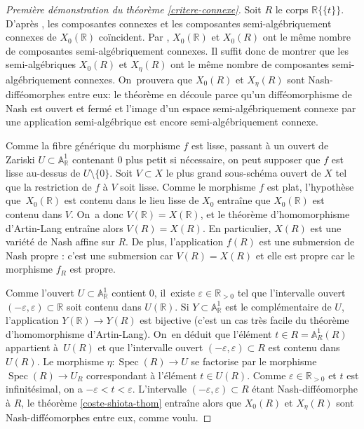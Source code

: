 \documentclass[11pt]{article}
\let\epsilon\varepsilon
\theoremstyle{definition}
\newcommand{\R}{\mathbb R}
\newcommand{\A}{\mathbb A}
\newcommand{\puiseux}{\mathbb{R}\{\!\{t\}\!\}}
\begin{document}
\begin{proof}[Première démonstration du théorème \ref{critere-connexe}]
Soit $R$ le corps $\puiseux$. D'après \cite[Th.\,2.4.5]{bochnak1987geometrie}, les composantes connexes et les composantes semi-algébriquement connexes de $X_0(\R)$ coïncident. Par \cite[Prop.\,5.3.6]{bochnak1998real}, $X_0(\R)$ et $X_0(R)$ ont le même nombre de composantes semi-algébriquement connexes. Il suffit donc de montrer que les semi-algébriques $X_0(R)$ et $X_\eta(R)$ ont le même nombre de composantes semi-algébriquement connexes. On~prouvera que $X_0(R)$ et $X_\eta(R)$ sont Nash-difféomorphes entre eux: le théorème en découle parce qu'un difféomorphisme de Nash est ouvert et fermé et l'image d'un espace semi-algébriquement connexe par une application semi-algébrique est encore semi-algébriquement connexe.

Comme la fibre générique du morphisme $f$ est lisse, passant à un ouvert de Zariski $U\subset \A^1_{\R}$ contenant $0$ plus petit si nécessaire, on peut supposer que $f$ est lisse au-dessus de $U\setminus\{0\}$. Soit $V\subset X$ le plus grand sous-schéma ouvert de $X$ tel que la restriction de $f$ à $V$ soit lisse. Comme le morphisme $f$ est plat, l'hypothèse que~$X_0(\R)$ est contenu dans le lieu lisse de $X_0$ entraîne que $X_0(\R)$ est contenu dans $V$. On~a donc $V(\R)=X(\R)$, et le théorème d'homomorphisme d'Artin-Lang \cite[Th.\,4.1.2]{bochnak1998real} entraîne alors $V(R)=X(R)$. En particulier, $X(R)$ est une variété de Nash affine sur $R$.
De plus, l'application $f(R)$ est une submersion de Nash propre : c'est une submersion car $V(R)=X(R)$ et elle est propre car le morphisme $f_R$ est propre.

Comme l'ouvert $U\subset \A^1_{\R}$ contient $0$, il~existe $\epsilon\in \R_{>0}$ tel que l'intervalle ouvert $(-\epsilon,\epsilon)\subset \R$ soit contenu dans $U(\R)$. Si $Y\subset \A^1_{\R}$ est le complémentaire de $U$, l'appli\-cation $Y(\R)\to Y(R)$ est bijective (c'est un cas très facile du théorème d'homomorphisme d'Artin-Lang). On~en déduit que l'élément $t\in R=\A^1_R(R)$ appartient à~$U(R)$ et que l'intervalle ouvert $(-\epsilon,\epsilon)\subset R$ est contenu dans $U(R)$. Le morphisme $\eta\colon \operatorname{Spec}(R) \to U$ se factorise par le morphisme $\operatorname{Spec}(R) \to U_R$ correspondant à l'élément $t\in U(R)$. Comme $\epsilon\in \R_{>0}$ et $t$ est infinitésimal, on a $-\epsilon < t<\epsilon$. L'intervalle $(-\epsilon,\epsilon)\subset R$ étant Nash-difféomorphe à $R$, le théorème \ref{coste-shiota-thom} entraîne alors que $X_0(R)$ et $X_\eta(R)$ sont Nash-difféomorphes entre eux, comme voulu.
\end{proof}
\end{document}
